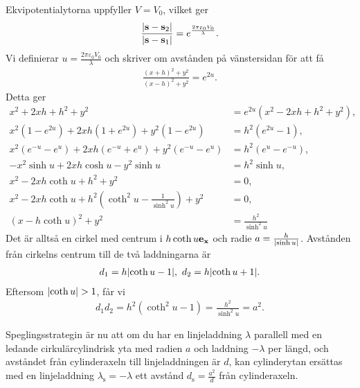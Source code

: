 Ekvipotentialytorna uppfyller $V = V_{0}$, vilket ger
\begin{align*}
	\frac{\abs{\vb{s} - \vb{s}_{2}}}{\abs{\vb{s} - \vb{s}_{1}}} = e^{\frac{2\pi\varepsilon_{0}V_{0}}{\lambda}}.
\end{align*}
Vi definierar $u = \frac{2\pi\varepsilon_{0}V_{0}}{\lambda}$ och skriver om avstånden på vänstersidan för att få
\begin{align*}
	\frac{(x + h)^{2} + y^{2}}{(x - h)^{2} + y^{2}} = e^{2u}.
\end{align*}
Detta ger
\begin{align*}
	x^{2} + 2xh + h^{2} + y^{2}                                                          &= e^{2u}(x^{2} - 2xh + h^{2} + y^{2}), \\
	x^{2}(1 - e^{2u}) + 2xh(1 + e^{2u}) + y^{2}(1 - e^{2u})                              &= h^{2}(e^{2u} - 1), \\
	x^{2}(e^{-u} - e^{u}) + 2xh(e^{-u} + e^{u}) + y^{2}(e^{-u} - e^{u})                  &= h^{2}(e^{u} - e^{-u}), \\
	-x^{2}\sinh{u} + 2xh\cosh{u} - y^{2}\sinh{u}                                         &= h^{2}\sinh{u}, \\
	x^{2} - 2xh\coth{u} + h^{2} + y^{2}                                                  &= 0, \\
	x^{2} - 2xh\coth{u} + h^{2}\left(\coth^{2}{u} - \frac{1}{\sinh^{2}{u}}\right) + y^{2}          &= 0, \\
	(x - h\coth{u})^{2} + y^{2}                                                          &= \frac{h^{2}}{\sinh^{2}{u}}
\end{align*}
Det är alltså en cirkel med centrum i $h\coth{u}\vb{e}_{\vb{x}}$ och radie $a = \frac{h}{\abs{\sinh{u}}}$. Avstånden från cirkelns centrum till de två laddningarna är
\begin{align*}
	d_{1} = h\abs{\coth{u} - 1},\ d_{2} = h\abs{\coth{u} + 1}.
\end{align*}
Eftersom $\abs{\coth{u}} > 1$, får vi
\begin{align*}
	d_{1}d_{2} = h^{2}(\coth^{2}{u} - 1) = \frac{h^{2}}{\sinh^{2}{u}} = a^{2}.
\end{align*}

Speglingsstrategin är nu att om du har en linjeladdning $\lambda$ parallell med en ledande cirkulärcylindrisk yta med radien $a$ och laddning $-\lambda$ per längd, och avståndet från cylinderaxeln till linjeladdningen är $d$, kan cylinderytan ersättas med en linjeladdning $\lambda_{\text{s}} = -\lambda$ ett avstånd $d_{\text{s}} = \frac{a^{2}}{d}$ från cylinderaxeln.

